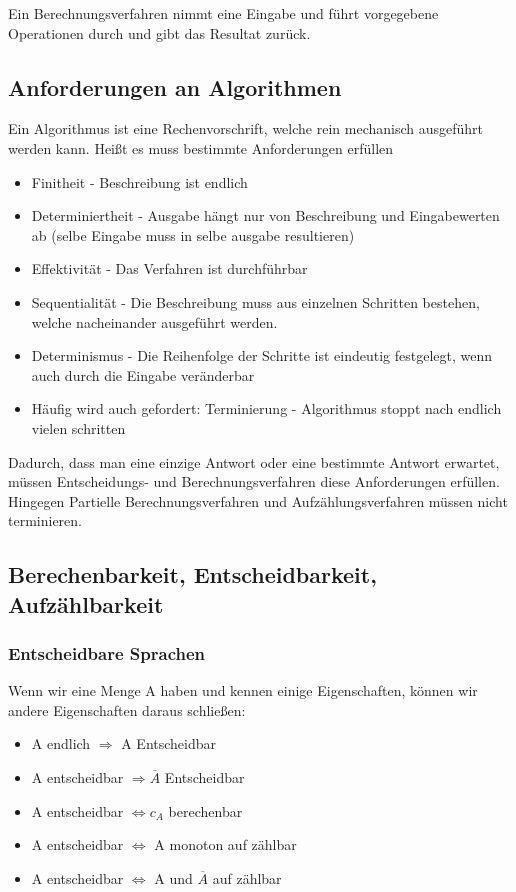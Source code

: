 \documentclass[12pt,a4paper]{article} %
\begin{document}
	Ein Berechnungsverfahren nimmt eine Eingabe und führt vorgegebene Operationen durch und gibt das Resultat zurück.
	
	\subsection{Anforderungen an Algorithmen}
	Ein Algorithmus ist eine Rechenvorschrift, welche rein mechanisch ausgeführt werden kann. Heißt es muss bestimmte Anforderungen erfüllen
	\begin{itemize}
		\item Finitheit - Beschreibung ist endlich
		\item Determiniertheit - Ausgabe hängt nur von Beschreibung und Eingabewerten ab (selbe Eingabe muss in selbe ausgabe resultieren)
		\item Effektivität - Das Verfahren ist durchführbar 
		\item Sequentialität - Die Beschreibung muss aus einzelnen Schritten bestehen, welche nacheinander ausgeführt werden. 
		\item Determinismus - Die Reihenfolge der Schritte ist eindeutig festgelegt, wenn auch durch die Eingabe veränderbar
		\item Häufig wird auch gefordert: Terminierung - Algorithmus stoppt nach endlich vielen schritten
	\end{itemize}
	
	Dadurch, dass man eine einzige Antwort oder eine bestimmte Antwort erwartet, müssen Entscheidungs- und Berechnungsverfahren diese Anforderungen erfüllen. Hingegen Partielle Berechnungsverfahren und Aufzählungsverfahren müssen nicht terminieren.
	
	\subsection{Berechenbarkeit, Entscheidbarkeit, Aufzählbarkeit}
	\subsubsection{Entscheidbare Sprachen}
	Wenn wir eine Menge A haben und kennen einige Eigenschaften, können wir andere Eigenschaften daraus schließen:
	
	\begin{itemize}
		\item A endlich $\Rightarrow$ A Entscheidbar
		\item A entscheidbar $\Rightarrow \overline{A}$ Entscheidbar
		\item A entscheidbar $\Leftrightarrow c_A$ berechenbar
		\item A entscheidbar $\Leftrightarrow$ A monoton auf zählbar
		\item A entscheidbar $\Leftrightarrow$ A und $\overline{A}$ auf zählbar
	\end{itemize}
	
\end{document}
